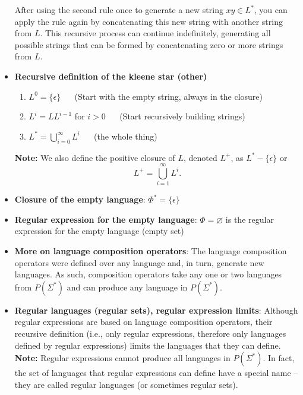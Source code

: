 \documentclass{report}
\begin{document}
\begin{itemize}
            \bigbreak \noindent 
            After using the second rule once to generate a new string \( xy \in L^* \), you can apply the rule again by concatenating this new string with another string from \( L \). This recursive process can continue indefinitely, generating all possible strings that can be formed by concatenating zero or more strings from \( L \).
        \item \textbf{Recursive definition of the kleene star (other)}
            \begin{enumerate}
                \item $L^{0} = \{\epsilon\}$ $\quad$ (Start with the empty string, always in the closure)
                \item $L^{i}=LL^{i-1}$ for $i>0$ $\quad$ (Start recursively building strings)
                \item $L^{*} = \bigcup_{i=0}^{\infty} L^{i}$ $\quad$ (the whole thing)
            \end{enumerate}
            \bigbreak \noindent 
            \textbf{Note:} We also define the positive closure of \( L \), denoted \( L^+ \), as \( L^* - \{\epsilon\} \) or
            \[
                L^+ = \bigcup_{i=1}^{\infty} L^i.
            \]
        \item \textbf{Closure of the empty language}: $\Phi^{*} = \{\epsilon\} $
        \item \textbf{Regular expression for the empty language}: $\Phi  = \varnothing$  is the regular expression for the empty language (empty set)
        \item \textbf{More on language composition operators}:
            The language composition operators were defined over any language and, in turn, generate new languages. As such, composition operators take any one or two languages from $P(\Sigma^{*})$ and can produce any language in $P(\Sigma^{*})$.
        \item \textbf{Regular languages (regular sets), regular expression limits}: Although regular expressions are based on language composition operators, their recursive definition (i.e., only regular expressions, therefore only languages defined by regular expressions) limits the languages that they can define.
            \bigbreak \noindent 
            \textbf{Note:} Regular expressions cannot produce all languages in $P(\Sigma^{*})$.
            \bigbreak \noindent 
            In fact, the set of languages that regular expressions can define have a special name – they are called regular languages (or sometimes regular sets).


\end{itemize}
\end{document}
